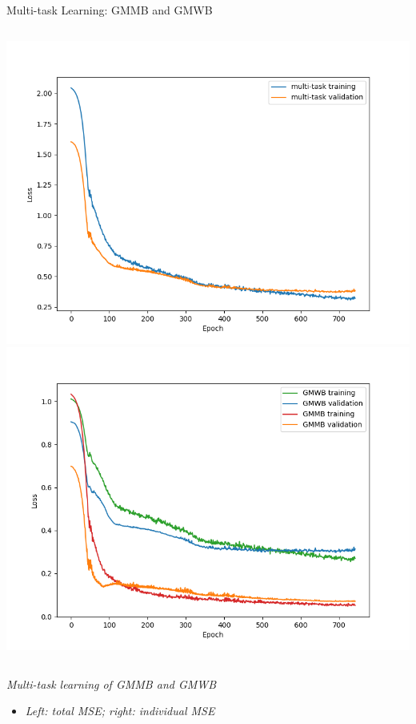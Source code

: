     \begin{frame}{Multi-task Learning: GMMB and GMWB}
    \begin{columns}
    \includegraphics[height=0.8\textheight]{../project3/figures/figure5a.png}
    \includegraphics[height=0.8\textheight]{../project3/figures/figure5b.png}
    \end{columns}
    
    \textit{Multi-task learning of GMMB and GMWB}
    \begin{itemize}
        \item \textit{Left: total MSE; right: individual MSE}
    \end{itemize}
    \end{frame}
    

